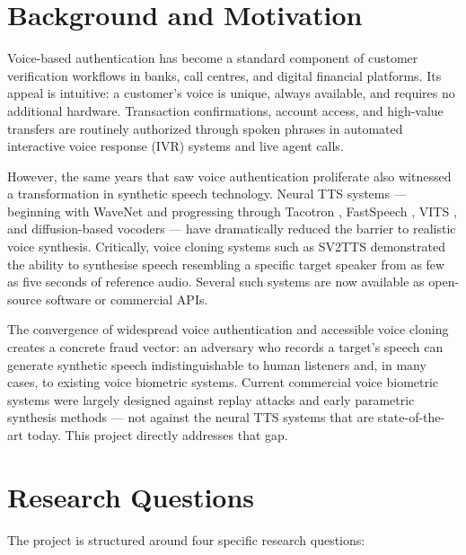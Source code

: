 \documentclass[12pt, a4paper, oneside]{report}
\begin{document}
\section{Background and Motivation}

Voice-based authentication has become a standard component of customer verification workflows in banks, call centres, and digital financial platforms. Its appeal is intuitive: a customer's voice is unique, always available, and requires no additional hardware. Transaction confirmations, account access, and high-value transfers are routinely authorized through spoken phrases in automated interactive voice response (IVR) systems and live agent calls.

However, the same years that saw voice authentication proliferate also witnessed a transformation in synthetic speech technology. Neural TTS systems --- beginning with WaveNet \citep{vandendoord2016} and progressing through Tacotron \citep{wang2017tacotron}, FastSpeech \citep{ren2019fastspeech}, VITS \citep{kim2021vits}, and diffusion-based vocoders --- have dramatically reduced the barrier to realistic voice synthesis. Critically, voice cloning systems such as SV2TTS \citep{jia2018} demonstrated the ability to synthesise speech resembling a specific target speaker from as few as five seconds of reference audio. Several such systems are now available as open-source software or commercial APIs.

The convergence of widespread voice authentication and accessible voice cloning creates a concrete fraud vector: an adversary who records a target's speech can generate synthetic speech indistinguishable to human listeners and, in many cases, to existing voice biometric systems. Current commercial voice biometric systems were largely designed against replay attacks and early parametric synthesis methods --- not against the neural TTS systems that are state-of-the-art today. This project directly addresses that gap.

\section{Research Questions}

The project is structured around four specific research questions:
\end{document}
